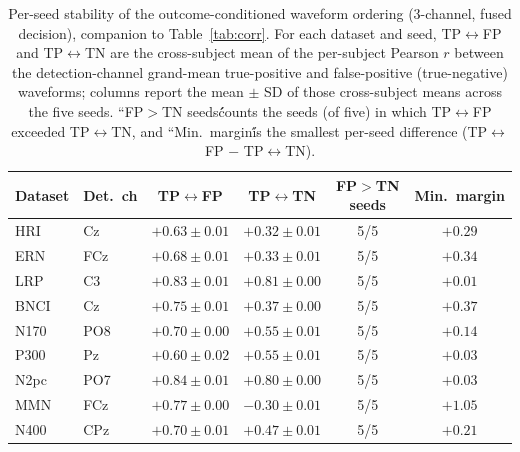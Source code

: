 \begin{table}[t]
\centering
\small
\setlength{\tabcolsep}{6pt}
\caption{Per-seed stability of the outcome-conditioned waveform ordering (3-channel, fused decision), companion to Table~\ref{tab:corr}. For each dataset and seed, TP$\leftrightarrow$FP and TP$\leftrightarrow$TN are the cross-subject mean of the per-subject Pearson $r$ between the detection-channel grand-mean true-positive and false-positive (true-negative) waveforms; columns report the mean $\pm$ SD of those cross-subject means across the five seeds. ``FP$>$TN seeds\'\' counts the seeds (of five) in which TP$\leftrightarrow$FP exceeded TP$\leftrightarrow$TN, and ``Min.\ margin\'\' is the smallest per-seed difference (TP$\leftrightarrow$FP $-$ TP$\leftrightarrow$TN).}
\label{tab:corr-perseed}
\begin{tabular}{llcccc}
\toprule
Dataset & Det.\ ch & TP$\leftrightarrow$FP & TP$\leftrightarrow$TN & FP$>$TN seeds & Min.\ margin \\
\midrule
HRI & Cz & $+0.63 \pm 0.01$ & $+0.32 \pm 0.01$ & 5/5 & $+0.29$ \\
ERN & FCz & $+0.68 \pm 0.01$ & $+0.33 \pm 0.01$ & 5/5 & $+0.34$ \\
LRP & C3 & $+0.83 \pm 0.01$ & $+0.81 \pm 0.00$ & 5/5 & $+0.01$ \\
BNCI & Cz & $+0.75 \pm 0.01$ & $+0.37 \pm 0.00$ & 5/5 & $+0.37$ \\
N170 & PO8 & $+0.70 \pm 0.00$ & $+0.55 \pm 0.01$ & 5/5 & $+0.14$ \\
P300 & Pz & $+0.60 \pm 0.02$ & $+0.55 \pm 0.01$ & 5/5 & $+0.03$ \\
N2pc & PO7 & $+0.84 \pm 0.01$ & $+0.80 \pm 0.00$ & 5/5 & $+0.03$ \\
MMN & FCz & $+0.77 \pm 0.00$ & $-0.30 \pm 0.01$ & 5/5 & $+1.05$ \\
N400 & CPz & $+0.70 \pm 0.01$ & $+0.47 \pm 0.01$ & 5/5 & $+0.21$ \\
\bottomrule
\end{tabular}
\end{table}
